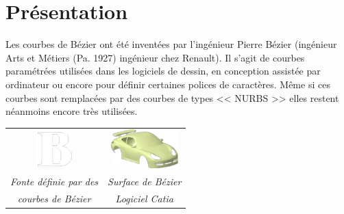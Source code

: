 \documentclass[10pt,fleqn]{article} %
\begin{document}

\vspace{1cm}
\pagestyle{fancy}
\thispagestyle{plain}

\section{Présentation}
\ifprof
\else
\begin{minipage}[c]{0.5\linewidth}
Les courbes de Bézier ont été inventées par l'ingénieur Pierre Bézier (ingénieur Arts et Métiers (Pa. 1927) ingénieur chez Renault). Il s'agit de courbes paramétrées utilisées dans les logiciels de dessin, en conception assistée par ordinateur ou encore pour définir certaines polices de caractères. Même si ces courbes sont remplacées par des courbes de types << NURBS >> elles restent néanmoins encore très utilisées. 
\end{minipage} \hfill
\begin{minipage}[c]{0.47\linewidth}
\begin{center}
\begin{tabular}{cc}
\includegraphics[height=1.5cm]{images/B} &
\includegraphics[height=1.5cm]{images/surface} \\
\textit{Fonte définie par des} & 
\textit{Surface de Bézier} \\
\textit{courbes de Bézier} & 
\textit{Logiciel Catia}  \\
\end{tabular}
\end{center}
\end{minipage}
\end{document}
